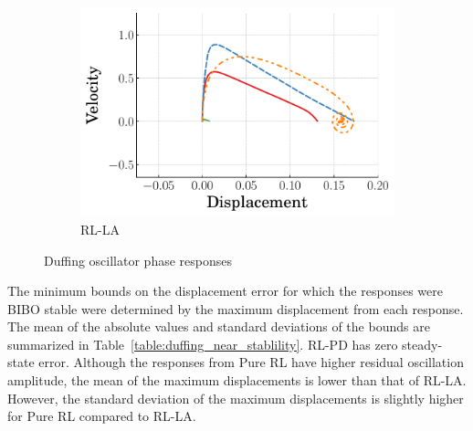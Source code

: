 \begin{figure}[h!]
\begin{subfigure}[b]{0.49\textwidth}
    \centering
    \includegraphics[width=\textwidth]{figures/figures_stability/time_responses_duffing/duffing_RL_LA/duffing_RL_LA_phase_plots.pdf}
    \caption{RL-LA}
    \label{subfig_chap3:duffing_RL_LA_phase_plot}
  \end{subfigure}
  \caption{Duffing oscillator phase responses}
  \label{fig_chap3:duffing_phase_plot}
\end{figure}
%

The minimum bounds on the displacement error for which the responses were BIBO stable were determined by the maximum displacement from each response. The mean of the absolute values and standard deviations of the bounds are summarized in Table~\ref{table:duffing_near_stablility}. RL-PD has zero steady-state error. Although the responses from Pure RL have higher residual oscillation amplitude, the mean of the maximum displacements is lower than that of RL-LA. However, the standard deviation of the maximum displacements is slightly higher for Pure RL compared to RL-LA.

